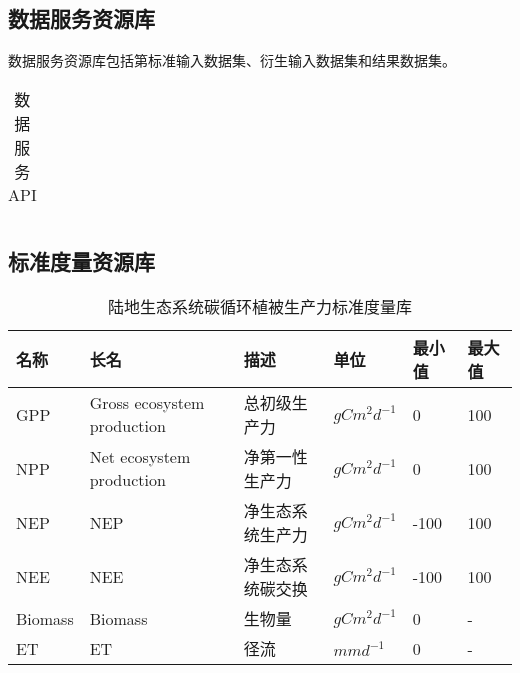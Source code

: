 \subsection{数据服务资源库}

数据服务资源库包括第标准输入数据集、衍生输入数据集和结果数据集。

\begin{table}
    \centering
    \caption{数据服务API}
    \label{tab:model-service-API}
    \begin{threeparttable}
        \begin{tabu} to 1
            \toprule[1.5pt]
            \midrule[1.5pt]
            \bottomrule[1.5pt]
        \end{tabu}
    \end{threeparttable}
\end{table}

\subsection{标准度量资源库}



\renewcommand{\arraystretch}{1.5}
\begin{table}[!htbp]
    \centering
    \caption{陆地生态系统碳循环植被生产力标准度量库}
    \label{tab:std-metrics}
    \begin{threeparttable}
        \begin{tabu}{ X[l m] X[5 l m] X[4 l m] X[l m] X[c m] X[c m]}
            \toprule[1.5pt]
            \textbf{名称} & \textbf{长名} & \textbf{描述} & \textbf{单位} & \textbf{最小值} & \textbf{最大值}  \\
            \midrule[1.5pt]
            GPP & Gross ecosystem production & 总初级生产力 & $gC m^2 d^{-1}$ & 0 & 100 \\
            NPP & Net ecosystem production & 净第一性生产力 & $gC m^2 d^{-1}$ & 0 & 100 \\
            NEP & NEP & 净生态系统生产力 & $gC m^2 d^{-1}$ & -100 & 100 \\
            NEE & NEE & 净生态系统碳交换 & $gC m^2 d^{-1}$ & -100 & 100 \\
            Biomass & Biomass & 生物量 & $gC m^2 d^{-1}$ & 0 & - \\
            ET & ET & 径流 & $mm d^{-1}$ & 0 & - \\
            \bottomrule[1.5pt]
        \end{tabu}
    \end{threeparttable}
\end{table}

